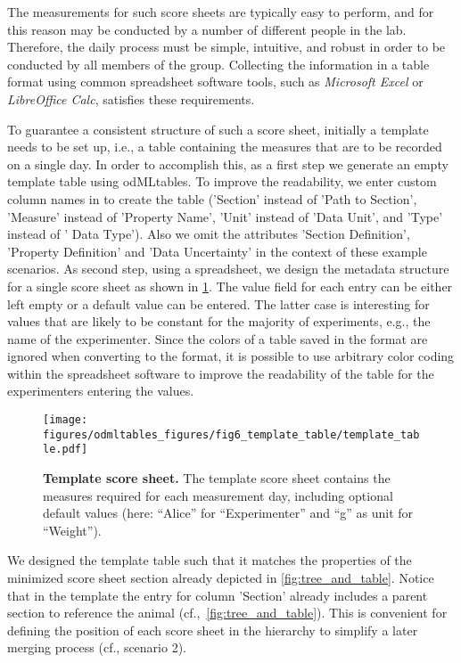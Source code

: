 The measurements for such score sheets are typically easy to perform, and for this reason may be conducted by a number of different people in the lab. Therefore, the daily process must be simple, intuitive, and robust in order to be conducted by all members of the group. Collecting the information in a table format using common spreadsheet software tools, such as \textit{Microsoft Excel} or \textit{LibreOffice Calc}, satisfies these requirements. 

To guarantee a consistent structure of such a score sheet, initially a template needs to be set up, i.e., a table containing the measures that are to be recorded on a single day. In order to accomplish this, as a first step we generate an empty template table using odMLtables. To improve the readability, we enter custom column names in  to create the table ('Section' instead of 'Path to Section', 'Measure' instead of 'Property Name', 'Unit' instead of 'Data Unit', and 'Type' instead of ' Data Type'). Also we omit the attributes 'Section Definition', 'Property Definition' and 'Data Uncertainty' in the context of these example scenarios. As second step, using a spreadsheet, we design the metadata structure for a single score sheet as shown in \cref{fig:template_table}. The value field for each entry can be either left empty or a default value can be entered. The latter case is interesting for values that are likely to be constant for the majority of experiments, e.g., the name of the experimenter. Since the colors of a table saved in the  format are ignored when converting to the  format, it is possible to use arbitrary color coding within the spreadsheet software to improve the readability of the table for the experimenters entering the values.

\begin{figure}[!ht]
\begin{center}
\texttt{[image: figures/odmltables\_figures/fig6\_template\_table/template\_table.pdf]}
\caption[Template score sheet]{\label{fig:template_table}
\textbf{Template score sheet.} The template score sheet contains the measures required for each measurement day, including optional default values (here: ``Alice'' for ``Experimenter'' and ``g'' as unit for ``Weight'').}
\end{center}
\end{figure}

We designed the template table such that it matches the properties of the minimized score sheet section already depicted in \cref{fig:tree_and_table}. Notice that in the template the entry for column 'Section' already includes a parent section to reference the animal (cf.,~\cref{fig:tree_and_table}). This is convenient for defining the position of each score sheet in the  hierarchy to simplify a later merging process (cf., scenario 2).

